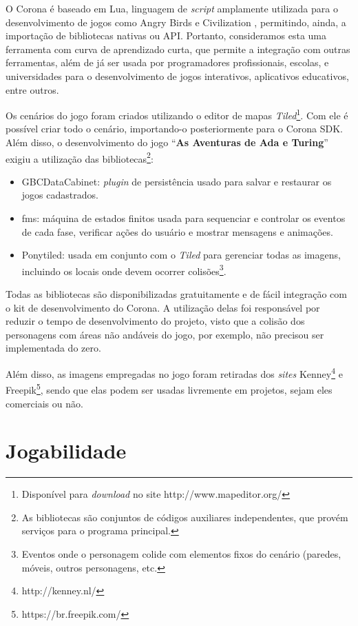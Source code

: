 O Corona é baseado em Lua, linguagem de \textit{script} amplamente utilizada para o desenvolvimento de jogos como Angry Birds \texttrademark e Civilization \texttrademark, permitindo, ainda, a importação de bibliotecas nativas ou \acrshort{API}. Portanto, consideramos esta uma ferramenta com curva de aprendizado curta, que permite a integração com outras ferramentas, além de já ser usada por programadores profissionais, escolas, e universidades para o desenvolvimento de jogos interativos, aplicativos educativos, entre outros.

Os cenários do jogo foram criados utilizando o editor de mapas \textit{Tiled}\footnote{Disponível para \textit{download} no site http://www.mapeditor.org/}. Com ele é possível criar todo o cenário, importando-o posteriormente para o Corona SDK. Além disso, o desenvolvimento do jogo “\textbf{As Aventuras de Ada e Turing}” exigiu a utilização das bibliotecas\footnote{As bibliotecas são conjuntos de códigos auxiliares independentes, que provém serviços para o programa principal.}:

\begin{itemize}
	\item GBCDataCabinet: \textit{plugin} de persistência usado para salvar e restaurar os jogos cadastrados.
	\item fms: máquina de estados finitos usada para sequenciar e controlar os eventos de cada fase, verificar ações do usuário e mostrar mensagens e animações.
	\item Ponytiled: usada em conjunto com o \textit{Tiled} para gerenciar todas as imagens, incluindo os locais onde devem ocorrer colisões\footnote{Eventos onde o personagem colide com elementos fixos do cenário (paredes, móveis, outros personagens, etc.}. 
\end{itemize}

Todas as bibliotecas são disponibilizadas gratuitamente e de fácil integração com o kit de desenvolvimento do Corona. A utilização delas foi responsável por reduzir o tempo de desenvolvimento do projeto, visto que a colisão dos personagens com áreas não andáveis do jogo, por exemplo, não precisou ser implementada do zero.

Além disso, as imagens empregadas no jogo foram retiradas dos \textit{sites} Kenney\footnote{http://kenney.nl/} e Freepik\footnote{https://br.freepik.com/}, sendo que elas podem ser usadas livremente em projetos, sejam eles comerciais ou não.

\section{Jogabilidade} \label{sec:jogabilidade}

